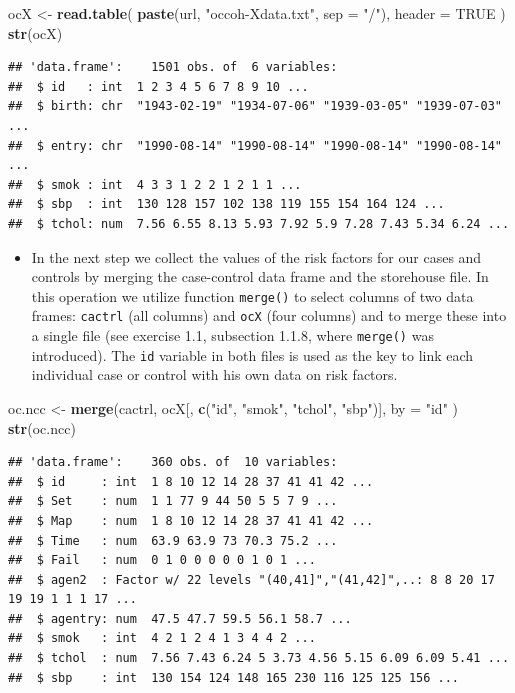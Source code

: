 \documentclass[
]{book}
\newenvironment{Shaded}{\begin{snugshade}}{\end{snugshade}}
\newcommand{\AttributeTok}[1]{\textcolor[rgb]{0.13,0.29,0.53}{#1}}
\newcommand{\ConstantTok}[1]{\textcolor[rgb]{0.56,0.35,0.01}{#1}}
\newcommand{\FunctionTok}[1]{\textcolor[rgb]{0.13,0.29,0.53}{\textbf{#1}}}
\newcommand{\NormalTok}[1]{#1}
\newcommand{\OtherTok}[1]{\textcolor[rgb]{0.56,0.35,0.01}{#1}}
\newcommand{\StringTok}[1]{\textcolor[rgb]{0.31,0.60,0.02}{#1}}
\providecommand{\tightlist}{%
  \setlength{\itemsep}{0pt}\setlength{\parskip}{0pt}}
\theoremstyle{definition}
\theoremstyle{definition}
\theoremstyle{definition}
\theoremstyle{definition}
\theoremstyle{remark}
\begin{document}
\begin{Shaded}
\begin{Highlighting}[]
\NormalTok{ocX }\OtherTok{\textless{}{-}} 
  \FunctionTok{read.table}\NormalTok{(}
    \FunctionTok{paste}\NormalTok{(url, }\StringTok{"occoh{-}Xdata.txt"}\NormalTok{, }\AttributeTok{sep =} \StringTok{"/"}\NormalTok{), }\AttributeTok{header =} \ConstantTok{TRUE}
\NormalTok{  )}
\FunctionTok{str}\NormalTok{(ocX)}
\end{Highlighting}
\end{Shaded}

\begin{verbatim}
## 'data.frame':    1501 obs. of  6 variables:
##  $ id   : int  1 2 3 4 5 6 7 8 9 10 ...
##  $ birth: chr  "1943-02-19" "1934-07-06" "1939-03-05" "1939-07-03" ...
##  $ entry: chr  "1990-08-14" "1990-08-14" "1990-08-14" "1990-08-14" ...
##  $ smok : int  4 3 3 1 2 2 1 2 1 1 ...
##  $ sbp  : int  130 128 157 102 138 119 155 154 164 124 ...
##  $ tchol: num  7.56 6.55 8.13 5.93 7.92 5.9 7.28 7.43 5.34 6.24 ...
\end{verbatim}

\begin{itemize}
\tightlist
\item
  In the next step we collect the values of the risk factors
  for our cases and controls by merging the case-control data frame and
  the storehouse file.
  In this operation we utilize function \texttt{merge()} to
  select columns of two data frames: \texttt{cactrl}
  (all columns) and \texttt{ocX} (four columns) and to merge
  these into a single file (see exercise 1.1, subsection 1.1.8, where
  \texttt{merge()} was introduced).
  The \texttt{id} variable in both files is used as the key to link each
  individual case or control with his own data on risk factors.
\end{itemize}

\begin{Shaded}
\begin{Highlighting}[]
\NormalTok{oc.ncc }\OtherTok{\textless{}{-}} \FunctionTok{merge}\NormalTok{(cactrl, ocX[, }\FunctionTok{c}\NormalTok{(}\StringTok{"id"}\NormalTok{, }\StringTok{"smok"}\NormalTok{, }\StringTok{"tchol"}\NormalTok{, }\StringTok{"sbp"}\NormalTok{)],}
  \AttributeTok{by =} \StringTok{"id"}
\NormalTok{)}
\FunctionTok{str}\NormalTok{(oc.ncc)}
\end{Highlighting}
\end{Shaded}

\begin{verbatim}
## 'data.frame':    360 obs. of  10 variables:
##  $ id     : int  1 8 10 12 14 28 37 41 41 42 ...
##  $ Set    : num  1 1 77 9 44 50 5 5 7 9 ...
##  $ Map    : num  1 8 10 12 14 28 37 41 41 42 ...
##  $ Time   : num  63.9 63.9 73 70.3 75.2 ...
##  $ Fail   : num  0 1 0 0 0 0 0 1 0 1 ...
##  $ agen2  : Factor w/ 22 levels "(40,41]","(41,42]",..: 8 8 20 17 19 19 1 1 1 17 ...
##  $ agentry: num  47.5 47.7 59.5 56.1 58.7 ...
##  $ smok   : int  4 2 1 2 4 1 3 4 4 2 ...
##  $ tchol  : num  7.56 7.43 6.24 5 3.73 4.56 5.15 6.09 6.09 5.41 ...
##  $ sbp    : int  130 154 124 148 165 230 116 125 125 156 ...
\end{verbatim}
\end{document}
